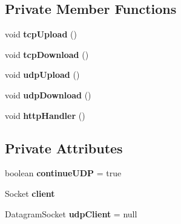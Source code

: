 \subsection*{Private Member Functions}
\begin{DoxyCompactItemize}
\item 
\hypertarget{classcom_1_1server_1_1ServerThread_a9f2b832582c529244e68717a480e47bf}{void {\bfseries tcp\-Upload} ()}\label{classcom_1_1server_1_1ServerThread_a9f2b832582c529244e68717a480e47bf}

\item 
\hypertarget{classcom_1_1server_1_1ServerThread_ac0e13af4a5f77da90d873e666016317c}{void {\bfseries tcp\-Download} ()}\label{classcom_1_1server_1_1ServerThread_ac0e13af4a5f77da90d873e666016317c}

\item 
\hypertarget{classcom_1_1server_1_1ServerThread_ab3bfacb3d82a51db195ecfef733f2ea1}{void {\bfseries udp\-Upload} ()}\label{classcom_1_1server_1_1ServerThread_ab3bfacb3d82a51db195ecfef733f2ea1}

\item 
\hypertarget{classcom_1_1server_1_1ServerThread_a69d6ff48a1d14da7d40968d5b3a1d2cb}{void {\bfseries udp\-Download} ()}\label{classcom_1_1server_1_1ServerThread_a69d6ff48a1d14da7d40968d5b3a1d2cb}

\item 
\hypertarget{classcom_1_1server_1_1ServerThread_ac9197dc3ac9e06be7fcbdbc72eed7439}{void {\bfseries http\-Handler} ()}\label{classcom_1_1server_1_1ServerThread_ac9197dc3ac9e06be7fcbdbc72eed7439}

\end{DoxyCompactItemize}
\subsection*{Private Attributes}
\begin{DoxyCompactItemize}
\item 
\hypertarget{classcom_1_1server_1_1ServerThread_acdc12e0a8fd08b1c6fc78a8776141cb2}{boolean {\bfseries continue\-U\-D\-P} = true}\label{classcom_1_1server_1_1ServerThread_acdc12e0a8fd08b1c6fc78a8776141cb2}

\item 
\hypertarget{classcom_1_1server_1_1ServerThread_a35497d54ac05820a80b8b6095a5276e8}{Socket {\bfseries client}}\label{classcom_1_1server_1_1ServerThread_a35497d54ac05820a80b8b6095a5276e8}

\item 
\hypertarget{classcom_1_1server_1_1ServerThread_a235f27cd5c41e5bf3a6e341ba54eefc3}{Datagram\-Socket {\bfseries udp\-Client} = null}\label{classcom_1_1server_1_1ServerThread_a235f27cd5c41e5bf3a6e341ba54eefc3}

\end{DoxyCompactItemize}


